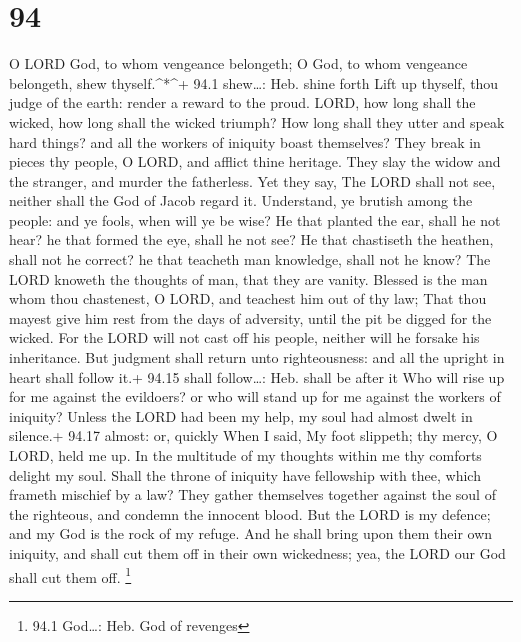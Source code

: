 \hypertarget{section-93}{%
\section{94}\label{section-93}}

 O LORD God, to whom vengeance belongeth; O God, to whom
vengeance belongeth, shew thyself.\^{}*\^{}+ 94.1 shew\ldots: Heb. shine
forth  Lift up thyself, thou judge of the earth: render a
reward to the proud.  LORD, how long shall the wicked, how
long shall the wicked triumph?  How long shall they utter
and speak hard things? and all the workers of iniquity boast themselves?
 They break in pieces thy people, O LORD, and afflict thine
heritage.  They slay the widow and the stranger, and murder
the fatherless.  Yet they say, The LORD shall not see,
neither shall the God of Jacob regard it.  Understand, ye
brutish among the people: and ye fools, when will ye be wise?
 He that planted the ear, shall he not hear? he that formed
the eye, shall he not see?  He that chastiseth the heathen,
shall not he correct? he that teacheth man knowledge, shall not he know?
 The LORD knoweth the thoughts of man, that they are
vanity.  Blessed is the man whom thou chastenest, O LORD,
and teachest him out of thy law;  That thou mayest give him
rest from the days of adversity, until the pit be digged for the wicked.
 For the LORD will not cast off his people, neither will he
forsake his inheritance.  But judgment shall return unto
righteousness: and all the upright in heart shall follow it.+ 94.15
shall follow\ldots: Heb. shall be after it  Who will rise
up for me against the evildoers? or who will stand up for me against the
workers of iniquity?  Unless the LORD had been my help, my
soul had almost dwelt in silence.+ 94.17 almost: or, quickly
 When I said, My foot slippeth; thy mercy, O LORD, held me
up.  In the multitude of my thoughts within me thy comforts
delight my soul.  Shall the throne of iniquity have
fellowship with thee, which frameth mischief by a law? 
They gather themselves together against the soul of the righteous, and
condemn the innocent blood.  But the LORD is my defence;
and my God is the rock of my refuge.  And he shall bring
upon them their own iniquity, and shall cut them off in their own
wickedness; yea, the LORD our God shall cut them off. \footnote{94.1
  God\ldots: Heb. God of revenges}

